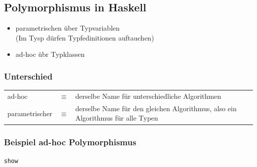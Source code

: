 
	\subsection{Polymorphismus in Haskell} %
	\label{sub:polymorphismus_in_haskell}
		\begin{itemize}
			\item parametrischen über Typvariablen\\
			(Im Tysp dürfen Typfedinitionen auftauchen)
			\item ad-hoc übr Typklassen
		\end{itemize}

		\subsubsection*{Unterschied} %
		\label{ssub:unterschied}
			\begin{tabular}{lcp{8cm}}
				ad-hoc & $\equiv$ & derselbe Name für unterschiedliche Algorithmen\\
				parametrischer & $\equiv$ & derselbe Name für den gleichen Algorithmus, also ein Algorithmus für alle Typen
			\end{tabular}

		\subsubsection*{Beispiel ad-hoc Polymorphismus} %
		\label{ssub:beispiel_ad_hoc_polymorphismus}
					\lstHaskell
			\begin{lstlisting}
show
			\end{lstlisting}
